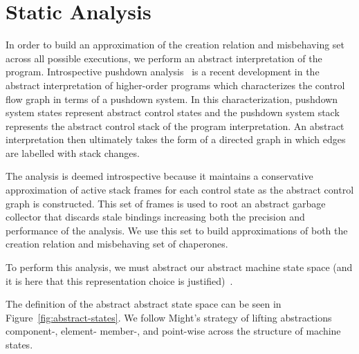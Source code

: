 \section{Static Analysis}

In order to build an approximation of the creation relation and misbehaving set across all possible executions, we perform an abstract interpretation of the program.
Introspective pushdown analysis~\cite{earl2012introspective} is a recent development in the abstract interpretation of higher-order programs which characterizes the control flow graph in terms of a pushdown system.
In this characterization, pushdown system states represent abstract control states and the pushdown system stack represents the abstract control stack of the program interpretation.
An abstract interpretation then ultimately takes the form of a directed graph in which edges are labelled with stack changes.

The analysis is deemed introspective because it maintains a conservative approximation of active stack frames for each control state as the abstract control graph is constructed.
This set of frames is used to root an abstract garbage collector that discards stale bindings increasing both the precision and performance of the analysis.
We use this set to build approximations of both the creation relation and misbehaving set of chaperones.

To perform this analysis, we must abstract our abstract machine state space (and it is here that this representation choice is justified)~\cite{van2010abstracting}.

The definition of the abstract abstract state space can be seen in Figure~\ref{fig:abstract-states}.
We follow Might's strategy of lifting abstractions component-, element- member-, and point-wise across the structure of machine states.

\newcommand{\astxclass}[4]{$#1\in\widehat{\mathbf{#2}}$ &::=& #3 & #4}
\newcommand{\aks}[0]{\hat{\gamma}^*}

